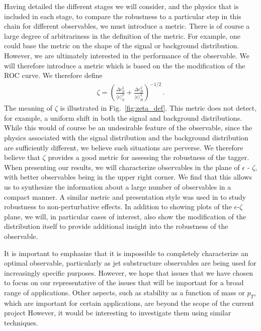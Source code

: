 \documentclass[11pt,letterpaper]{article}
\DeclareRobustCommand{\Fig}[1]{Fig.~\ref{#1}}
\begin{document}
Having detailed the different stages we will consider, and the physics that is included in each stage,  to compare the robustness to a particular step in this chain for different observables, we must introduce a metric. There is of course a large degree of arbitrariness in the definition of the metric. For example, one could base the metric on the shape of the signal or background distribution. However, we are ultimately interested in the performance of the observable. We will therefore introduce a metric which is based on the the modification of the ROC curve. We therefore define
\begin{align}
\zeta=\left(  \frac{\Delta \epsilon_S^2}{ \langle \epsilon \rangle_S^2}  +\frac{\Delta \epsilon_B^2}{ \langle \epsilon \rangle_B^2}  \right)^{-1/2}\,.
\end{align}
The meaning of $\zeta$ is illustrated in \Fig{fig:zeta_def}.
This metric does not detect, for example, a uniform shift in both the signal and background distributions. While this would of course be an undesirable feature of the observable, since the physics associated with the signal distribution and the background distribution are sufficiently different, we believe such situations are perverse. We therefore believe that $\zeta$ provides a good metric for assessing the robustness of the tagger. When presenting our results, we will characterize observables in the plane of $\epsilon$ - $\zeta$, with better observables being in the upper right corner. We find that this allows us to synthesize the information about a large number of observables in a compact manner. A similar metric and presentation style was used in \cite{Salam:2016yht} to study robustness to non-perturbative effects. In addition to showing plots of the $\epsilon$-$\zeta$ plane, we will, in particular cases of interest, also show the modification of the distribution itself to provide additional insight into the robustness of the observable.


It is important to emphasize that it is impossible to completely characterize an optimal observable, particularly as jet substructure observables are being used for increasingly specific purposes. However, we hope that issues that we have chosen to focus on our representative of the issues that will be important for a broad range of applications. Other aspects, such as stability as a function of mass or $p_T$, which are important for certain applications, are beyond the scope of the current project However, it would be interesting to investigate them using similar techniques.
\end{document}
